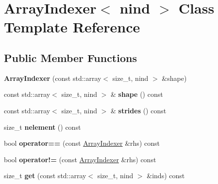 \hypertarget{classArrayIndexer}{}\section{Array\+Indexer$<$ nind $>$ Class Template Reference}
\label{classArrayIndexer}
\subsection*{Public Member Functions}
\begin{DoxyCompactItemize}
\item 
{\bfseries Array\+Indexer} (const std\+::array$<$ size\+\_\+t, nind $>$ \&shape)\hypertarget{classArrayIndexer_ad9b60dd97a659e98714086e590fb5b5b}{}\label{classArrayIndexer_ad9b60dd97a659e98714086e590fb5b5b}

\item 
const std\+::array$<$ size\+\_\+t, nind $>$ \& {\bfseries shape} () const \hypertarget{classArrayIndexer_ab08612cb4550cd91be6b2fdfafc2d884}{}\label{classArrayIndexer_ab08612cb4550cd91be6b2fdfafc2d884}

\item 
const std\+::array$<$ size\+\_\+t, nind $>$ \& {\bfseries strides} () const \hypertarget{classArrayIndexer_a2c3106b78644e231d9b5001c0159dd8c}{}\label{classArrayIndexer_a2c3106b78644e231d9b5001c0159dd8c}

\item 
size\+\_\+t {\bfseries nelement} () const \hypertarget{classArrayIndexer_a96b4a71939c3e4dec1a6b7dfaa59edc7}{}\label{classArrayIndexer_a96b4a71939c3e4dec1a6b7dfaa59edc7}

\item 
bool {\bfseries operator==} (const \hyperlink{classArrayIndexer}{Array\+Indexer} \&rhs) const \hypertarget{classArrayIndexer_a78187b61aa8b9a045c055134bd3e5523}{}\label{classArrayIndexer_a78187b61aa8b9a045c055134bd3e5523}

\item 
bool {\bfseries operator!=} (const \hyperlink{classArrayIndexer}{Array\+Indexer} \&rhs) const \hypertarget{classArrayIndexer_a9e28dd49f6182971986d23f8cbd2ea04}{}\label{classArrayIndexer_a9e28dd49f6182971986d23f8cbd2ea04}

\item 
size\+\_\+t {\bfseries get} (const std\+::array$<$ size\+\_\+t, nind $>$ \&inds) const \hypertarget{classArrayIndexer_a95bf030f6af13493d10a2fa7c89116a8}{}\label{classArrayIndexer_a95bf030f6af13493d10a2fa7c89116a8}

\end{DoxyCompactItemize}
